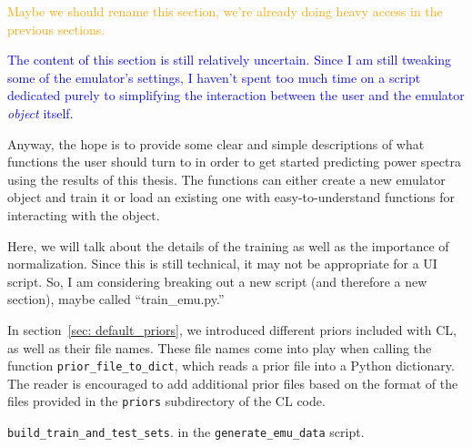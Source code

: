 \textcolor{orange}{Maybe we should rename this section, we're already doing
heavy access in the previous sections.}

\textcolor{blue}{The content of this section is still relatively uncertain. 
Since I am still tweaking some of the emulator's settings, I haven't spent too 
much time on a script dedicated purely to simplifying the interaction between 
the user and the emulator \textit{object} itself.}

Anyway, the hope is to provide some clear and simple descriptions of what functions the user should turn to in order to get started predicting power spectra using the results of this thesis. The functions can either create a new emulator object and train it or load an existing one with easy-to-understand functions for interacting with the object.

Here, we will talk about the details of the training as well as the importance of normalization. Since this is still technical, it may not be appropriate for a UI script. So, I am considering breaking out a new script (and therefore a new section), maybe called ``train\_emu.py.''


In section~\ref{sec: default_priors}, we introduced different priors 
included with CL, as well as their file names. These file names come into play 
when calling the function \verb|prior_file_to_dict|, which reads a prior file
into a Python dictionary. The reader is encouraged to add additional prior
files based on the format of the files provided in the \verb|priors|
subdirectory of the CL code.


\verb|build_train_and_test_sets|. in the
\verb|generate_emu_data| script.